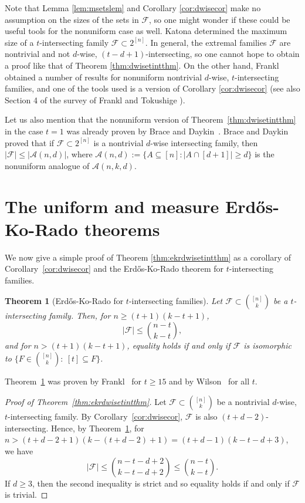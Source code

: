 \documentclass[12pt]{article}
\newtheorem{theorem}{Theorem}
\theoremstyle{definition}
\newcommand{\cA}{\mathcal{A}}
\newcommand{\cF}{\mathcal{F}}
\begin{document}
Note that Lemma \ref{lem:msetslem} and Corollary \ref{cor:dwisecor} make no assumption on the sizes of the sets in $\cF$, so one might wonder if these could be useful tools for the nonuniform case as well. Katona \cite{K} determined the maximum size of a $t$-intersecting family $\cF \subset 2^{[n]}$. In general, the extremal families $\cF$ are nontrivial and not $d$-wise, $(t-d+1)$-intersecting, so one cannot hope to obtain a proof like that of Theorem \ref{thm:dwisetintthm}. On the other hand, Frankl \cite{F} obtained a number of results for nonuniform nontrivial $d$-wise, $t$-intersecting families, and one of the tools used is a version of Corollary \ref{cor:dwisecor} (see also Section 4 of the survey of Frankl and Tokushige \cite{FT1}). 

Let us also mention that the nonuniform version of Theorem~\ref{thm:dwisetintthm} in the case $t=1$ was already proven by Brace and Daykin~\cite{BD}. Brace and Daykin proved that if $\cF \subset 2^{[n]}$ is a nontrivial $d$-wise intersecting family, then $|\cF| \le |\cA(n, d)|$, where $\cA(n, d):= \{A\subseteq [n] : |A\cap [d+1]|\ge d\}$ is the nonuniform analogue of $\cA(n, k, d)$. 

\section{The uniform and measure Erd\H{o}s-Ko-Rado theorems}

We now give a simple proof of Theorem \ref{thm:ekrdwisetintthm} as a corollary of Corollary~\ref{cor:dwisecor} and the Erd\H{o}s-Ko-Rado theorem for $t$-intersecting families. 

\begin{theorem}[Erd\H{o}s-Ko-Rado for $t$-intersecting families]\label{thm:ekrtintthm}
Let $\cF \subset \binom{[n]}{k}$ be a $t$-intersecting family. Then, for $n \ge (t+1)(k-t+1)$,
\[|\cF| \le \binom{n-t}{k-t},\]
and for $n > (t+1)(k-t+1)$, equality holds if and only if $\cF$ is isomorphic to $\{F \in \binom{[n]}{k}:\ [t] \subseteq F\}$.
\end{theorem}

Theorem~\ref{thm:ekrtintthm} was proven by Frankl~\cite{F3} for $t\ge 15$ and by Wilson~\cite{Wil} for all $t$. 

\begin{proof}[Proof of Theorem~\ref{thm:ekrdwisetintthm}]
Let $\cF \subset \binom{[n]}{k}$ be a nontrivial $d$-wise, $t$-intersecting family. By Corollary~\ref{cor:dwisecor}, $\cF$ is also $(t+d-2)$-intersecting. Hence, by Theorem~\ref{thm:ekrtintthm}, for $n > (t+d-2+1)(k-(t+d-2)+1) = (t+d-1)(k-t-d+3)$, we have
\[|\cF| \le \binom{n-t-d+2}{k-t-d+2} \le \binom{n-t}{k-t}.\]
If $d\ge 3$, then the second inequality is strict and so equality holds if and only if $\cF$ is trivial. 
\end{proof}
\end{document}
